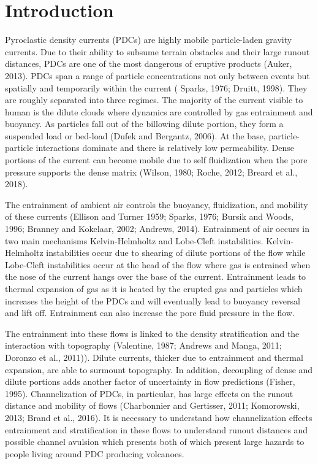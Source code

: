 \section{Introduction}
\label{sec:intro}
Pyroclastic density currents (PDCs) are highly mobile particle-laden gravity currents. Due to their ability to subsume terrain obstacles and their large runout distances, PDCs are one of the most dangerous of eruptive products (Auker, 2013). PDCs span a range of particle concentrations not only between events but spatially and temporarily within the current ( Sparks, 1976; Druitt, 1998). They are roughly separated into three regimes. The majority of the current visible to human is the dilute clouds where dynamics are controlled by gas entrainment and buoyancy. As particles fall out of the billowing dilute portion, they form a suspended load or bed-load (Dufek and Bergantz, 2006). At the base, particle-particle interactions dominate and there is relatively low permeability. Dense portions of the current can become mobile due to self fluidization when the pore pressure supports the dense matrix (Wilson, 1980; Roche, 2012; Breard et al., 2018). 

The entrainment of ambient air controls the buoyancy, fluidization, and mobility of these currents (Ellison and Turner 1959; Sparks, 1976; Bursik and Woods, 1996;  Branney and Kokelaar, 2002; Andrews, 2014). Entrainment of air occurs in two main mechanisms Kelvin-Helmholtz and Lobe-Cleft instabilities. Kelvin-Helmholtz instabilities occur due to shearing of dilute portions of the flow while Lobe-Cleft instabilities occur at the head of the flow where gas is entrained when the nose of the current hangs over the base of the current. Entrainment leads to thermal expansion of gas as it is heated by the erupted gas and particles which increases the height of the PDCs and will eventually lead to buoyancy reversal and lift off. Entrainment can also increase the pore fluid pressure in the flow. 

The entrainment into these flows is linked to the density stratification and the interaction with topography (Valentine, 1987; Andrews and Manga, 2011; Doronzo et al., 2011)). Dilute currents, thicker due to entrainment and thermal expansion, are able to surmount topography. In addition, decoupling of dense and dilute portions adds another factor of uncertainty in flow predictions (Fisher, 1995). Channelization of PDCs, in particular, has large effects on the runout distance and mobility of flows (Charbonnier and Gertisser, 2011; Komorowski, 2013; Brand et al., 2016). It is necessary to understand how channelization effects entrainment and stratification in these flows to understand runout distances and possible channel avulsion which presents both of which present large hazards to people living around PDC producing volcanoes.

